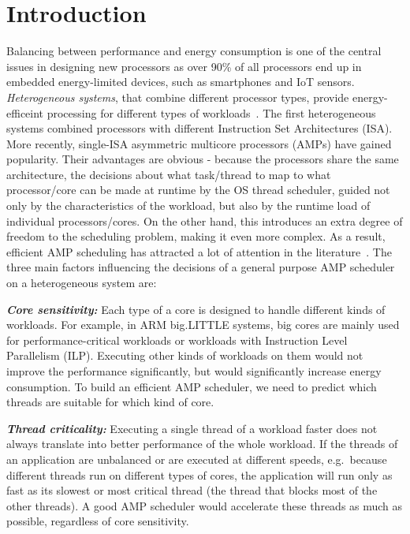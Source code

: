 \section{Introduction}
\label{itr}

Balancing between performance and energy consumption is one of the central issues in designing new processors as over 90\% of all processors end up in embedded energy-limited devices, such as smartphones and IoT sensors. \emph{Heterogeneous systems}, that combine different processor types, provide energy-efficeint processing for different types of workloads~\cite{seeker2014measuring}. The first heterogeneous systems combined processors with different Instruction Set Architectures (ISA). More recently, single-ISA asymmetric multicore processors (AMPs) have gained popularity. Their advantages are obvious - because the processors share the same architecture, the decisions about what task/thread to map to what processor/core can be made at runtime by the OS thread scheduler, guided not only by the characteristics of the workload, but also by the runtime load of individual processors/cores. On the other hand, this introduces an extra degree of freedom to the scheduling problem, making it even more complex. As a result, efficient AMP scheduling has attracted a lot of attention in the literature~\cite{mittal2016survey}. The three main factors influencing the decisions of a general purpose AMP scheduler on a heterogeneous system are: 

\textbf{\textit{Core sensitivity:}} Each type of a core is designed to handle different kinds of workloads. For example, in ARM big.LITTLE systems, big cores are mainly used for performance-critical workloads or workloads with Instruction Level Parallelism (ILP). Executing other kinds of workloads on them would not improve the performance significantly, but would significantly increase energy consumption. To build an efficient AMP scheduler, we need to predict which threads are suitable for which kind of core.

\textbf{\textit{Thread criticality:}} Executing a single thread of a workload faster does not always translate into better performance of the whole workload. If the threads of an application are unbalanced or are executed at different speeds, e.g.~because different threads run on different types of cores, the application will run only as fast as its slowest or most critical thread (the thread that blocks most of the other threads). A good AMP scheduler would accelerate these threads as much as possible, regardless of core sensitivity. 


